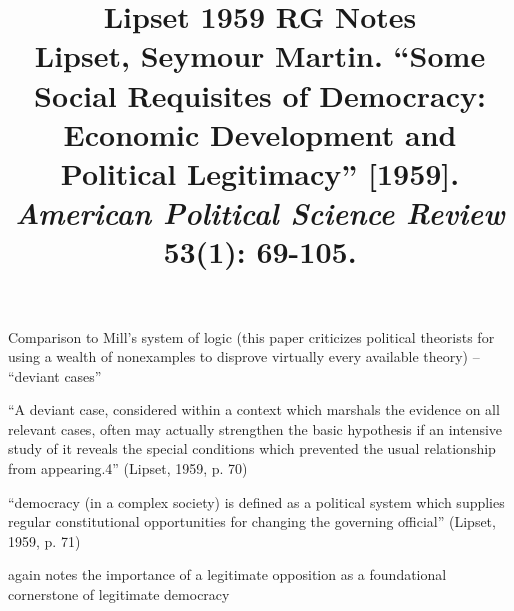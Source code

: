 \documentclass[12pt]{article}
\title{\textbf{Lipset 1959 RG Notes}\\
\large Lipset, Seymour Martin. ``Some Social Requisites of Democracy: Economic Development and Political Legitimacy'' [1959].\\
\textit{American Political Science Review} 53(1): 69-105.}
\author{}
\date{}
\begin{document}
\maketitle

Comparison to Mill's system of logic (this paper criticizes political theorists for using a wealth of nonexamples to disprove virtually every available theory) -- ``deviant cases''

``A deviant case, considered within a context which marshals the evidence on all relevant cases, often may actually strengthen the basic hypothesis if an intensive study of it reveals the special conditions which prevented the usual relationship from appearing.4'' (Lipset, 1959, p. 70)

``democracy (in a complex society) is defined as a political system which supplies regular constitutional opportunities for changing the governing official'' (Lipset, 1959, p. 71)

again notes the importance of a legitimate opposition as a foundational cornerstone of legitimate democracy
\end{document}
